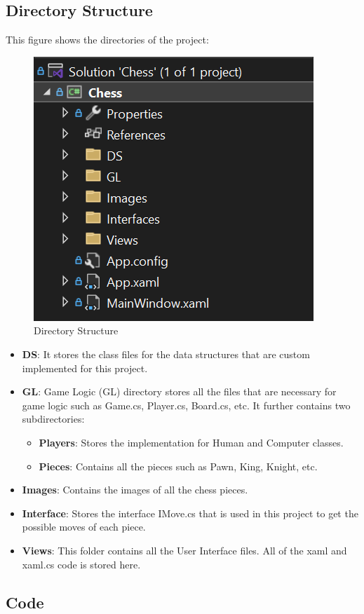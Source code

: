 \documentclass[a4paper,12pt]{article}
\begin{document}
\subsection{Directory Structure}
This figure shows the directories of the project:
\begin{figure}[H]
    \centering
    \includegraphics[width=0.5\linewidth]{Images/DirectoryStructure.png}
    \caption{Directory Structure}
    \label{fig:directoryStructure}
\end{figure}

\begin{itemize}
    \item \textbf{DS}: It stores the class files for the data structures that are custom implemented for this project. 
    \item \textbf{GL}: Game Logic (GL) directory stores all the files that are necessary for game logic such as Game.cs, Player.cs, Board.cs, etc. It further contains two subdirectories:
    \begin{itemize}
        \item \textbf{Players}: Stores the implementation for Human and Computer classes.
        \item \textbf{Pieces}: Contains all the pieces such as Pawn, King, Knight, etc.
    \end{itemize}
    \item \textbf{Images}: Contains the images of all the chess pieces.
    \item \textbf{Interface}: Stores the interface IMove.cs that is used in this project to get the possible moves of each piece.
    \item \textbf{Views}: This folder contains all the User Interface files. All of the xaml and xaml.cs code is stored here.
\end{itemize}


\subsection{Code}
\end{document}
